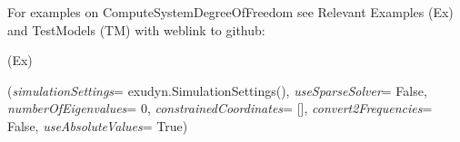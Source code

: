 %
\noindent For examples on ComputeSystemDegreeOfFreedom see Relevant Examples (Ex) and TestModels (TM) with weblink to github:
\bi
 \item \footnotesize {} (Ex)
\ei

%
\begin{flushleft}
\label{sec:mainsystemextensions:ComputeODE2Eigenvalues}
({\it simulationSettings}= exudyn.SimulationSettings(), {\it useSparseSolver}= False, {\it numberOfEigenvalues}= 0, {\it constrainedCoordinates}= [], {\it convert2Frequencies}= False, {\it useAbsoluteValues}= True)
\end{flushleft}
\setlength{\itemindent}{0.7cm}
